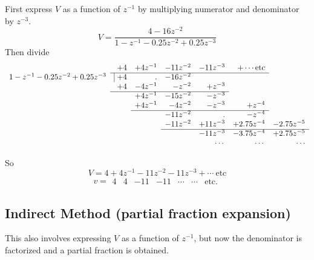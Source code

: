 First express $V$ as a function of $z^{-1}$ by multiplying numerator
and denominator by $z^{-3}$.
\[ V = \frac{4-16z^{-2}}{1-z^{-1}-0.25 z^{-2} + 0.25 z^{-3}} \]
Then divide \[
\begin{array}{rrrrrrr}
   & +4 & +4z^{-1} & -11z^{-2} & -11z^{-3} & +\cdots  \mathrm{etc}& \\ \cline{2-6}
  1-z^{-1}-0.25
z^{-2} + 0.25 z^{-3} &  \vline\ +4 & . & -16z^{-2} &  & &
\\
   & +4 & -4z^{-1} & -z^{-2} & +z^{-3} &  &  \\ \cline{2-5}
   &  &   +4z^{-1} & -15z^{-2} & -z^{-3} &  &  \\
   &  &   +4z^{-1} & - 4z^{-2} & -z^{-3} & +z^{-4} &  \\
   \cline{3-6}
   &  &           & -11z^{-2} & .         &    -z^{-4} &  \\
   &  &           & -11z^{-2} & +11z^{-3} & +2.75z^{-4} & -2.75z^{-5}
   \\\cline{4-7}
  &   &           &           & -11z^{-3} & -3.75z^{-4} &
  +2.75z^{-5} \\
    &   &           &           & \cdots & \cdots &
  \cdots \\
\end{array}
\]

So \[ V = 4 + 4z^{-1} -11 z^{-2} -11z^{-3} + \cdots\
\mathrm{etc}\] \[ v = \begin{array}{ccccccc}
  4 & 4 & -11 & -11 & \cdots & \cdots & \mathrm{etc}.
\end{array} \]

\subsection*{Indirect Method (partial fraction expansion)}
This also involves expressing $V$ as a function of $z^{-1}$, but
now the denominator is factorized and a partial fraction is
obtained.

